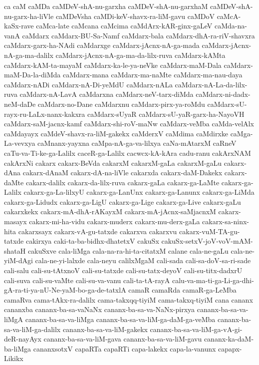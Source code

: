 {ca
caM
caMDa
caMDeV-shA-nu-garxha
caMDeV-shA-nu-garxhaM
caMDeV-shA-nu-garx-ha-liVle
caMDeVsha
caMDi-keV-shavx-ra-liM-gavu
caMDoV
caMcA-kaSx-rave
caMca-late
caMcana
caMcima
caMdArx-kAR-ginx-gaLeV
caMda-na-vanA
caMdarx
caMdarx-BU-Sa-Namf
caMdarx-bala
caMdarx-dhA-ra-riV-shavxra
caMdarx-garx-ha-NAdi
caMdarxge
caMdarx-jAcnx-nA-ga-mada
caMdarx-jAcnx-nA-ga-ma-dalilx
caMdarx-jAcnx-nA-ga-ma-da-lilx-ruva
caMdarx-kAMta
caMdarx-kAM-ta-mayaM
caMdarx-ka-le-ya-neVke
caMdarx-maM-Dala
caMdarx-maM-Da-la-diMda
caMdarx-mana
caMdarx-ma-naMte
caMdarx-ma-nau-daya
caMdarx-nADi
caMdarx-nA-Di-yeMdU
caMdarx-nALa
caMdarx-nA-La-da-lilx-ruva
caMdarx-nA-LavA
caMdarxna
caMdarx-neV-tarx-diMda
caMdarx-ni-dadx-neM-daDe
caMdarx-no-Dane
caMdarxnu
caMdarx-pirx-ya-roMdu
caMdarx-sU-rayx-ru-LaLx-nanx-kakxra
caMdarx-sUyaR
caMdarx-sU-yaR-garx-ha-NayoVH
caMdarx-saM-jacnx-kamf
caMdarx-shi-roV-maNw
caMdarx-veMba
caMda-velAlx
caMdayayx
caMdeV-shavx-ra-liM-gakekx
caMderxV
caMdima
caMdirxke
caMga-La-vevxya
caMnanx-yayxna
caMpa-nA-ga-va-lilxya
caNa-mAtarxM
caRneV
caTu-va-Ti-ke-ga-Lalilx
caceR-ga-Lalilx
cacwcx-kA-kAra
cadu-ranu
cakArxNAM
cakArxNi
cakarx
cakarx-BeVda
cakarxM
cakarxM-gaLa
cakarxM-gaLu
cakarx-dAna
cakarx-dAnaM
cakarx-dA-na-liVle
cakarxda
cakarx-daM-Dakekx
cakarx-daMte
cakarx-dalilx
cakarx-da-lilx-ruva
cakarx-gaLa
cakarx-ga-LaMte
cakarx-ga-Lalilx
cakarx-ga-La-lilxyU
cakarx-ga-LanUnx
cakarx-ga-Lanunx
cakarx-ga-LiMda
cakarx-ga-Lidudx
cakarx-ga-LigU
cakarx-ga-Lige
cakarx-ga-Live
cakarx-gaLu
cakarxkekx
cakarx-mA-dhA-rAKayxM
cakarx-mA-jAcnx-saMjacnxM
cakarx-masayx
cakarx-mi-ha-vidu
cakarx-muderx
cakarx-mu-derx-gaLa
cakarx-sa-ninx-hita
cakarxsayx
cakarx-vA-gu-tatxde
cakarxva
cakarxvu
cakarx-vuM-TA-gu-tatxde
cakirxya
caki-ta-ba-bidhx-dhatetxV
cakuSx
cakuSx-setxV-joV-voV-mAM-shataH
cakuSxve
cala-liMga
cala-na-ra-hi-ta-citatxM
calane
cala-ne-gaLu
cala-ne-yiM-dAgi
cala-ne-yi-lalxde
cala-neyu
calilxMgaM
cali-sada
cali-sa-doV-sa-ri-sade
cali-salu
cali-su-tAtxnoV
cali-su-tatxde
cali-su-tatx-deyoV
cali-su-titx-dadxrU
cali-suva
cali-su-vaMte
cali-su-va-vanu
cali-ta-tA-rayA
calu-va-ma-ti-ga-Li-ga-dhi-gA-ra-ti-ya-nU-Ne-yaM-bo-ga-de-tatxlA
camaR
camaRda
camaR-ga-LeMba
camaRva
cama-tAkx-ra-dalilx
cama-takxqq-tiyiM
cama-takxq-tiyiM
cana
cananx
cananxba
cananx-ba-sa-vaNaNx
cananx-ba-sa-va-NaNx-pirxya
cananx-ba-sa-va-liMgA
cananx-ba-sa-va-liMga
cananx-ba-sa-va-liM-ga-daM-ga-veMba
cananx-ba-sa-va-liM-ga-dalilx
cananx-ba-sa-va-liM-gakekx
cananx-ba-sa-va-liM-ga-vA-gi-deR-nayAyx
cananx-ba-sa-va-liM-gava
cananx-ba-sa-va-liM-gavu
cananx-ka-daM-ba-liMga
cananxsotxV
capaRTa
capaRTi
capa-lakekx
capa-la-vanunx
capapx-Likikx
}
